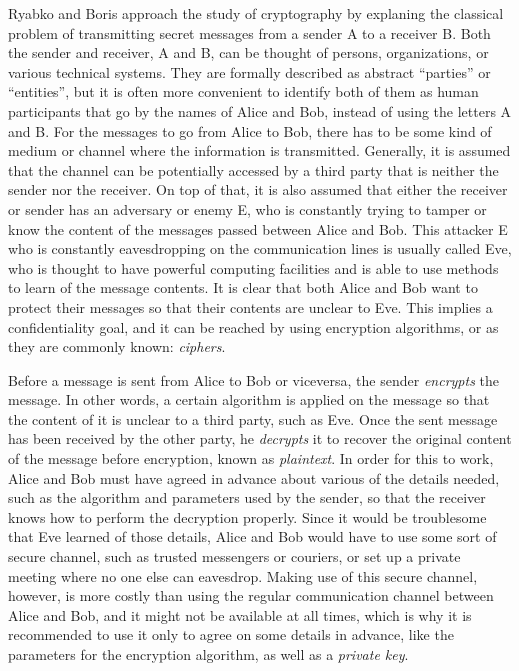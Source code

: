 Ryabko and Boris \cite{CryptoIT} approach the study of cryptography by explaning the classical problem of transmitting secret messages from a sender A to a receiver B. Both the sender and receiver, A and B, can be thought of persons, organizations, or various technical systems.  They are formally described as abstract ``parties'' or ``entities'', but it is often more convenient to identify both of them as human participants that go by the names of Alice and Bob, instead of using the letters A and B.
For the messages to go from Alice to Bob, there has to be some kind of medium or channel where the information is transmitted. Generally, it is assumed that the channel can be potentially accessed by a third party that is neither the sender nor the receiver. On top of that, it is also assumed that either the receiver or sender has an adversary or enemy E, who is constantly trying to tamper or know the content of the messages passed between Alice and Bob. This attacker E who is constantly eavesdropping on the communication lines is usually called Eve, who is thought to have powerful computing facilities and is able to use methods to learn of the message contents.  It is clear that both Alice and Bob want to protect their messages so that their contents are unclear to Eve. This implies a confidentiality goal, and it can be reached by using encryption algorithms, or as they are commonly known: \emph{ciphers}.

Before a message is sent from Alice to Bob or viceversa, the sender \textit{encrypts} the message. In other words, a certain algorithm is applied on the message so that the content of it is unclear to a third party, such as Eve. Once the sent message has been received by the other party, he \textit{decrypts} it to recover the original content of the message before encryption, known as \textit{plaintext}. In order for this to work, Alice and Bob must have agreed in advance about various of the details needed, such as the algorithm and parameters used by the sender, so that the receiver knows how to perform the decryption properly. Since it would be troublesome that Eve learned of those details, Alice and Bob would have to use some sort of secure channel, such as trusted messengers or couriers, or set up a private meeting where no one else can eavesdrop. Making use of this secure channel, however, is more costly than using the regular communication channel between Alice and Bob, and it might not be available at all times, which is why it is recommended to use it only to agree on some details in advance, like the parameters for the encryption algorithm, as well as a \textit{private key}.

